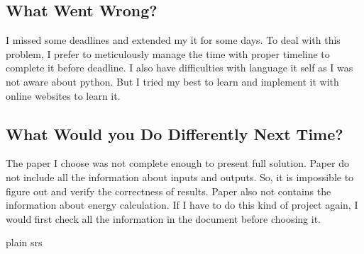 \documentclass{article}
\begin{document}
\subsection{What Went Wrong?}

I missed some deadlines and extended my it for some days. To deal with this problem, I prefer to meticulously manage the time with proper timeline to complete it before deadline. I also have difficulties with language it self as I was not aware about python. But I tried my best to learn and implement it with online websites to learn it.  

\subsection{What Would you Do Differently Next Time?}

The paper\cite{MathsModel} I choose was not complete enough to present full solution. Paper do not include all the information about inputs and outputs. So, it is impossible to figure out and verify the correctness of results. Paper also not contains the information about energy calculation. If I have to do this kind of project again, I would first check all the information in the document before choosing it. 

\newpage

 {plain}
 {srs}
\end{document}
